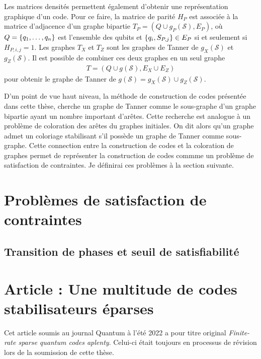 Les matrices densités permettent également d'obtenir une représentation graphique d'un code.
Pour ce faire, la matrice de parité $H_P$ est associée à la matrice d'adjacence d'un
graphe bipartie $T_P = (Q \cup g_P(\mathcal S), E_P)$,
où $Q = \qty{q_1, \dots, q_n}$ est l'ensemble des qubits
et $\qty{q_i, S_{P, j}} \in E_P$ si et seulement si $H_{P, i, j} = 1$.
Les graphes $T_X$ et $T_Z$ sont les graphes de Tanner de $g_X(\mathcal S)$ et $g_Z(\mathcal S)$.
Il est possible de combiner ces deux graphes en un seul graphe
\begin{align}
  T = (Q \cup g(\mathcal S), E_X \cup E_Z)
\end{align}
pour obtenir le graphe de Tanner de $g(\mathcal S) = g_X(\mathcal S) \cup g_Z(\mathcal S)$.

D'un point de vue haut niveau,
la méthode de construction de codes présentée dans cette thèse,
cherche un graphe de Tanner comme le sous-graphe d'un graphe bipartie
ayant un nombre important d'arêtes.
Cette recherche est analogue à un problème de coloration des arêtes du graphes initiales.
On dit alors qu'un graphe admet un coloriage stabilisant s'il possède un graphe de Tanner comme sous-graphe.
Cette connection entre la construction de codes et la coloration de graphes permet 
de représenter la construction de codes commme un problème de satisfaction de contraintes.
Je définirai ces problèmes à la section suivante.

\section{Problèmes de satisfaction de contraintes}
\label{sec:csp}

\subsection{Transition de phases et seuil de satisfiabilité}


\section{Article : Une multitude de codes stabilisateurs éparses}

Cet article soumis au journal Quantum à l'été 2022 a pour titre original
\textit{Finite-rate sparse quantum codes aplenty}.
Celui-ci était toujours en processus de révision lors de la soumission de cette thèse.


